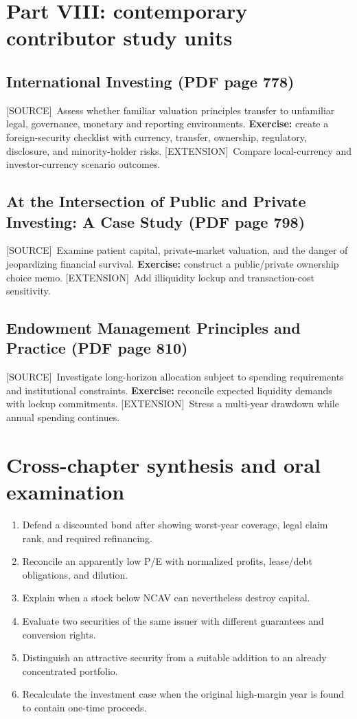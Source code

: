 \documentclass[11pt,letterpaper]{article}
\newcommand{\src}{\textsf{\color{sea}[SOURCE]}}
\newcommand{\ext}{\textsf{\color{gold}[EXTENSION]}}
\begin{document}
\section{Part VIII: contemporary contributor study units}
\subsection{International Investing (PDF page 778)}
\src\ Assess whether familiar valuation principles transfer to unfamiliar legal, governance, monetary and reporting environments. \textbf{Exercise:} create a foreign-security checklist with currency, transfer, ownership, regulatory, disclosure, and minority-holder risks. \ext\ Compare local-currency and investor-currency scenario outcomes.
\subsection{At the Intersection of Public and Private Investing: A Case Study (PDF page 798)}
\src\ Examine patient capital, private-market valuation, and the danger of jeopardizing financial survival. \textbf{Exercise:} construct a public/private ownership choice memo. \ext\ Add illiquidity lockup and transaction-cost sensitivity.
\subsection{Endowment Management Principles and Practice (PDF page 810)}
\src\ Investigate long-horizon allocation subject to spending requirements and institutional constraints. \textbf{Exercise:} reconcile expected liquidity demands with lockup commitments. \ext\ Stress a multi-year drawdown while annual spending continues.

\section{Cross-chapter synthesis and oral examination}
\begin{enumerate}
\item Defend a discounted bond after showing worst-year coverage, legal claim rank, and required refinancing.
\item Reconcile an apparently low P/E with normalized profits, lease/debt obligations, and dilution.
\item Explain when a stock below NCAV can nevertheless destroy capital.
\item Evaluate two securities of the same issuer with different guarantees and conversion rights.
\item Distinguish an attractive security from a suitable addition to an already concentrated portfolio.
\item Recalculate the investment case when the original high-margin year is found to contain one-time proceeds.
\end{enumerate}
\end{document}
